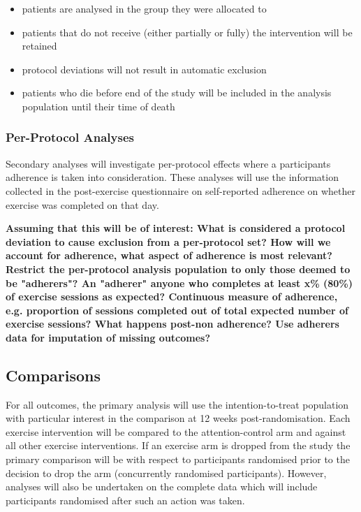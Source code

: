 \documentclass[11pt,parskip=half-]{scrartcl}
\providecommand{\tightlist}{%
  \setlength{\itemsep}{0pt}\setlength{\parskip}{0pt}}
\begin{document}
\begin{itemize}
  \tightlist
  \item patients are analysed in the group they were allocated to
  \item patients that do not receive (either partially or fully) the intervention will be retained
  \item protocol deviations will not result in automatic exclusion
  \item patients who die before end of the study  will be included in the analysis population until their time of death
\end{itemize}

\subsubsection{Per-Protocol Analyses}

Secondary analyses will investigate per-protocol effects where a participants adherence is taken into consideration. These analyses will use the information collected in the post-exercise questionnaire on self-reported adherence on whether exercise was completed on that day.

\textbf{
  Assuming that this will be of interest:
  What is considered a protocol deviation to cause exclusion from a per-protocol set?
  How will we account for adherence, what aspect of adherence is most relevant?
  Restrict the per-protocol analysis population to only those deemed to be "adherers"?
  An "adherer" anyone who completes at least x\% (80\%) of exercise sessions as expected?
  Continuous measure of adherence, e.g. proportion of sessions completed out of total expected number of exercise sessions?
  What happens post-non adherence? Use adherers data for imputation of missing outcomes?
}

\subsection{Comparisons}\label{analysis-comparisons}

For all outcomes, the primary analysis will use the intention-to-treat population with particular interest in the comparison at 12 weeks post-randomisation. Each exercise intervention will be compared to the attention-control arm and against all other exercise interventions. If an exercise arm is dropped from the study the primary comparison will be with respect to participants randomised prior to the decision to drop the arm (concurrently randomised participants). However, analyses will also be undertaken on the complete data which will include participants randomised after such an action was taken.
\end{document}
